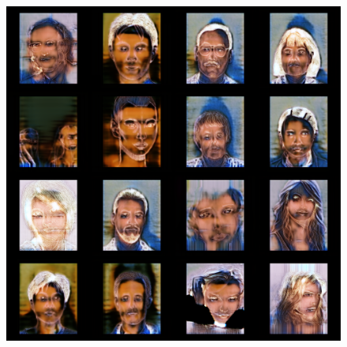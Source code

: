 \begin{figure}[ht]
\begin{center}
    \includegraphics[scale=0.16]{Graphics/ske2pic_result_before_clean.png}


\end{center}
\end{figure}
